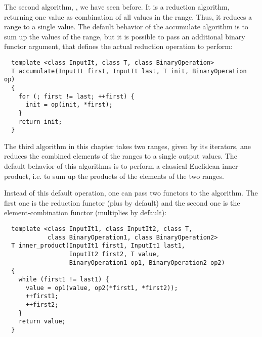 The second algorithm, , we have seen before. It is a reduction algorithm, returning one value as combination of all values in the range.
Thus, it reduces a range to a single value. The default behavior of the accumulate algorithm is to sum up the values of the range, but it is possible to
pass an additional binary functor argument, that defines the actual reduction operation to perform:
%
\begin{samepage}
\begin{verbatim}
  template <class InputIt, class T, class BinaryOperation>
  T accumulate(InputIt first, InputIt last, T init, BinaryOperation op)
  {
    for (; first != last; ++first) {
      init = op(init, *first);
    }
    return init;
  }
\end{verbatim}
\end{samepage}

The third algorithm in this chapter takes two ranges, given by its iterators, ane reduces the combined elements of the ranges to a single output values.
The default behavior of this algorithms is to perform a classical Euclidean inner-product, i.e. to sum up the products of the elements of the two ranges.

Instead of this default operation, one can pass two functors to the algorithm. The first one is the reduction functor (plus by default) and the second one
is the element-combination functor (multiplies by default):
%
\begin{samepage}
\begin{verbatim}
  template <class InputIt1, class InputIt2, class T,
            class BinaryOperation1, class BinaryOperation2>
  T inner_product(InputIt1 first1, InputIt1 last1,
                  InputIt2 first2, T value,
                  BinaryOperation1 op1, BinaryOperation2 op2)
  {
    while (first1 != last1) {
      value = op1(value, op2(*first1, *first2));
      ++first1;
      ++first2;
    }
    return value;
  }
\end{verbatim}
\end{samepage}

